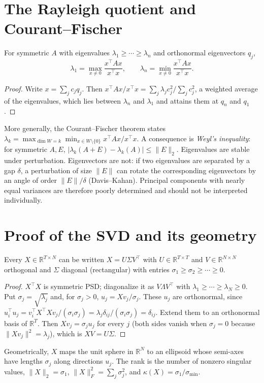 \section{The Rayleigh quotient and Courant--Fischer}
For symmetric $A$ with eigenvalues $\lambda_1\ge\cdots\ge\lambda_n$ and orthonormal eigenvectors $q_j$,
\[
\lambda_1=\max_{x\ne0}\frac{x^\top Ax}{x^\top x},\qquad\lambda_n=\min_{x\ne0}\frac{x^\top Ax}{x^\top x}.
\]
\begin{proof}
Write $x=\sum_jc_jq_j$. Then $x^\top Ax/x^\top x=\sum_j\lambda_jc_j^2/\sum_jc_j^2$, a weighted average of the eigenvalues, which lies between $\lambda_n$ and $\lambda_1$ and attains them at $q_n$ and $q_1$.
\end{proof}
More generally, the Courant--Fischer theorem states $\lambda_k=\max_{\dim W=k}\min_{x\in W\setminus\{0\}}x^\top Ax/x^\top x$. A consequence is \emph{Weyl's inequality}: for symmetric $A,E$, $|\lambda_k(A+E)-\lambda_k(A)|\le\|E\|_2$. Eigenvalues are stable under perturbation. Eigenvectors are not: if two eigenvalues are separated by a gap $\delta$, a perturbation of size $\|E\|$ can rotate the corresponding eigenvectors by an angle of order $\|E\|/\delta$ (Davis--Kahan). Principal components with nearly equal variances are therefore poorly determined and should not be interpreted individually.

\section{Proof of the SVD and its geometry}
\begin{theorem}
Every $X\in\mathbb R^{T\times N}$ can be written $X=U\Sigma V^\top$ with $U\in\mathbb R^{T\times T}$ and $V\in\mathbb R^{N\times N}$ orthogonal and $\Sigma$ diagonal (rectangular) with entries $\sigma_1\ge\sigma_2\ge\cdots\ge0$.
\end{theorem}
\begin{proof}
$X^\top X$ is symmetric PSD; diagonalize it as $V\Lambda V^\top$ with $\lambda_1\ge\cdots\ge\lambda_N\ge0$. Put $\sigma_j=\sqrt{\lambda_j}$ and, for $\sigma_j>0$, $u_j=Xv_j/\sigma_j$. These $u_j$ are orthonormal, since $u_i^\top u_j=v_i^\top X^\top Xv_j/(\sigma_i\sigma_j)=\lambda_j\delta_{ij}/(\sigma_i\sigma_j)=\delta_{ij}$. Extend them to an orthonormal basis of $\mathbb R^T$. Then $Xv_j=\sigma_ju_j$ for every $j$ (both sides vanish when $\sigma_j=0$ because $\|Xv_j\|^2=\lambda_j$), which is $XV=U\Sigma$.
\end{proof}
Geometrically, $X$ maps the unit sphere in $\mathbb R^N$ to an ellipsoid whose semi-axes have lengths $\sigma_j$ along directions $u_j$. The rank is the number of nonzero singular values, $\|X\|_2=\sigma_1$, $\|X\|_F^2=\sum_j\sigma_j^2$, and $\kappa(X)=\sigma_1/\sigma_{\min}$.

